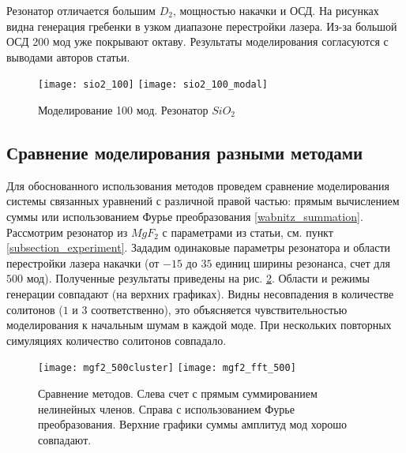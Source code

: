 Резонатор отличается большим $D_2$, мощностью накачки и ОСД. На рисунках видна генерация гребенки в узком диапазоне перестройки лазера. Из-за большой ОСД 200 мод уже покрывают октаву. Результаты моделирования согласуются с выводами авторов статьи.

\begin{figure}
  \texttt{[image: sio2\_100]}
  \texttt{[image: sio2\_100\_modal]}
  \caption{Моделирование 100 мод. Резонатор $SiO_2$} \label{sio2}
\end{figure}

\subsection{Сравнение моделирования разными методами}

Для обоснованного использования методов проведем сравнение моделирования системы связанных уравнений с различной правой частью: прямым вычислением суммы или использованием Фурье преобразования \ref{wabnitz_summation}. Рассмотрим резонатор из $MgF_2$ с параметрами из статьи\cite{mlg_to_nature}, см. пункт \ref{subsection_experiment}. Зададим одинаковые параметры резонатора и области перестройки лазера накачки (от $-15$ до $35$ единиц ширины резонанса, счет для $500$ мод). Полученные результаты приведены на рис. \ref{comparison_sum_ft}. Области и режимы генерации совпадают (на верхних графиках). Видны несовпадения в количестве солитонов ($1$ и $3$ соответственно), это объясняется чувствительностью моделирования к начальным шумам в каждой моде. При нескольких повторных симуляциях количество солитонов совпадало.
\begin{figure}
  \texttt{[image: mgf2\_500cluster]}
  \texttt{[image: mgf2\_fft\_500]}
  \caption{Сравнение методов. Слева счет с прямым суммированием нелинейных членов. Справа с использованием Фурье преобразования. Верхние графики суммы амплитуд мод хорошо совпадают.} \label{comparison_sum_ft}
\end{figure}

